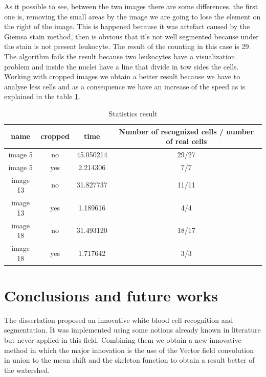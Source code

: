 As it possible to see, between the two images there are some differences. the first one is, removing the small areas by the image we are going to lose the element on the right of the image. This is happened because it was artefact caused by the Giemsa stain method, then is obvious that it's not well segmented because under the stain is not present  leukocyte. The result of the counting in this case is 29. The algorithm fails the result because two leukocytes have a visualization problem and inside the nuclei have a line that divide in tow sides the cells.
Working with cropped images we obtain a better result because we have to analyse less cells and as a consequence we have an increase of the speed as is explained in the table \ref{statistics}.
\begin{table}
\centering
\begin{tabular}{|c|c|c|c|}
\hline 
name & cropped & time & Number of recognized cells / number of real cells\\ 
\hline 
image 5 & no & 45.050214 & 29/27\\ 
\hline 
image 5 & yes & 2.214306 & 7/7\\ 
\hline 
image 13 & no & 31.827737 & 11/11 \\ 
\hline 
image 13 & yes & 1.189616 & 4/4 \\ 
\hline 
image 18 & no & 31.493120 & 18/17\\ 
\hline 
image 18 & yes & 1.717642 & 3/3 \\ 
\hline 
\end{tabular} 
\caption{Statistics result}
\label{statistics}
\end{table}

\section{Conclusions and future works}
The dissertation proposed an innovative white blood cell recognition and segmentation. It was implemented using some notions already known in literature but never applied in this field. Combining them we obtain a new innovative method in which the major innovation is the use of the Vector field convolution in union to the mean shift and the skeleton function to obtain a result better of the watershed.

\bigskip

